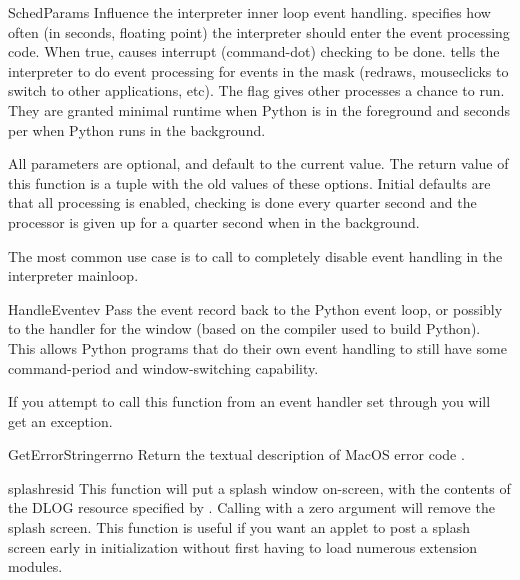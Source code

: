 \begin{funcdesc}{SchedParams}{}
Influence the interpreter inner loop event handling. 
specifies how often (in seconds, floating point) the interpreter
should enter the event processing code. When true,  causes
interrupt (command-dot) checking to be done.  tells the
interpreter to do event processing for events in the mask (redraws,
mouseclicks to switch to other applications, etc). The 
flag gives other processes a chance to run. They are granted minimal
runtime when Python is in the foreground and  seconds per
 when Python runs in the background.

All parameters are optional, and default to the current value. The return
value of this function is a tuple with the old values of these options.
Initial defaults are that all processing is enabled, checking is done every
quarter second and the processor is given up for a quarter second when in the
background.

The most common use case is to call  to completely disable
event handling in the interpreter mainloop.
\end{funcdesc}

\begin{funcdesc}{HandleEvent}{ev}
Pass the event record  back to the Python event loop, or
possibly to the handler for the  window (based on the
compiler used to build Python). This allows Python programs that do
their own event handling to still have some command-period and
window-switching capability.

If you attempt to call this function from an event handler set through
 you will get an exception.
\end{funcdesc}

\begin{funcdesc}{GetErrorString}{errno}
Return the textual description of MacOS error code .
\end{funcdesc}

\begin{funcdesc}{splash}{resid}
This function will put a splash window
on-screen, with the contents of the DLOG resource specified by
. Calling with a zero argument will remove the splash
screen. This function is useful if you want an applet to post a splash screen
early in initialization without first having to load numerous
extension modules.
\end{funcdesc}


